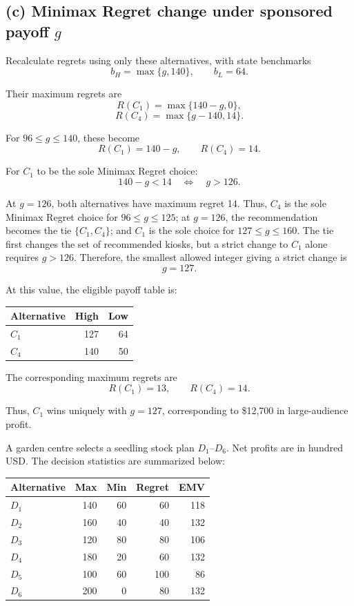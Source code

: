 \subsection*{(c) Minimax Regret change under sponsored payoff $g$ }

Recalculate regrets using only these alternatives,
with state benchmarks
\[
b_H=\max\{g,140\},\qquad b_L=64.
\]

Their maximum regrets are
\[
R(C_1)=\max\{140-g,0\},
\]
\[
R(C_4)=\max\{g-140,14\}.
\]

For $96\le g\le140$, these become
\[
R(C_1)=140-g,\qquad R(C_4)=14.
\]

For $C_1$ to be the sole Minimax Regret choice:
\[
140-g<14
\quad\Longleftrightarrow\quad g>126.
\]

At $g=126$, both alternatives have maximum regret 14.
Thus, $C_4$ is the sole Minimax Regret choice for $96\le g\le125$;
at $g=126$, the recommendation becomes the tie $\{C_1,C_4\}$;
and $C_1$ is the sole choice for $127\le g\le160$.
The tie first changes the set of recommended kiosks, but a strict
change to $C_1$ alone requires $g>126$.
Therefore, the smallest allowed integer giving a strict change is
\[
\boxed{g=127}.
\]

At this value, the eligible payoff table is:

\begin{center}\small\setlength{\tabcolsep}{4pt}
	\begin{tabular}{lrr}\toprule
		Alternative & High & Low\\ \midrule
		$C_1$ & 127 & 64\\
		$C_4$ & 140 & 50\\
		\bottomrule
	\end{tabular}
\end{center}

The corresponding maximum regrets are
\[
R(C_1)=13,\qquad R(C_4)=14.
\]

Thus, $C_1$ wins uniquely with $g=127$,
corresponding to \$12,700 in large-audience profit.
\secInicio[sec:q2]



A garden centre selects a seedling stock plan $D_1$--$D_6$. Net profits are in hundred USD. The decision statistics are summarized below:

\vspace{-3mm}
\begin{center}\small\setlength{\tabcolsep}{4pt}
	\begin{tabular}{lrrrr}\toprule
		Alternative & Max & Min & Regret & EMV\\ \midrule
		$D_1$ & 140 & 60 & 60 & 118\\
		$D_2$ & 160 & 40 & 40 & 132\\
		$D_3$ & 120 & 80 & 80 & 106\\
		$D_4$ & 180 & 20 & 60 & 132\\
		$D_5$ & 100 & 60 & 100 & 86\\
		$D_6$ & 200 & 0 & 80 & 132\\
		\bottomrule
	\end{tabular}
\end{center}
\vspace{-3mm}

